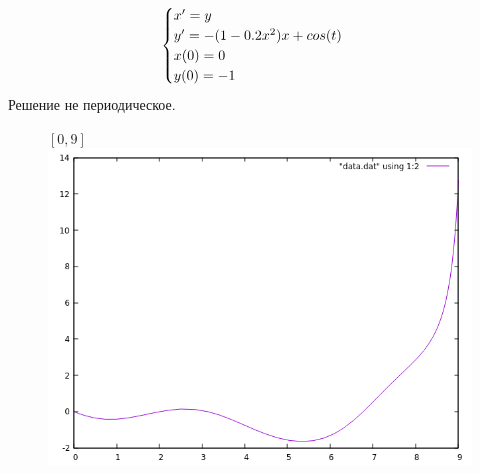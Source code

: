 \documentclass[12pt, a4paper] {article}
\theoremstyle{remark}
\theoremstyle{definition}
\begin{document}
\newpage
\begin{gather}
\begin{cases}
\notag x' = y \\
\notag y' = -(1 - 0.2x^2)x + cos(t) \\
\notag x(0) = 0 \\
\notag y(0) = -1
\end{cases}
\end{gather}
Решение не периодическое.
\begin{figure}[h!]
$[0, 9]$ \\
\centering
\includegraphics[width=1\linewidth]{min_0_9.png} 
\end{figure}
\end{document}
